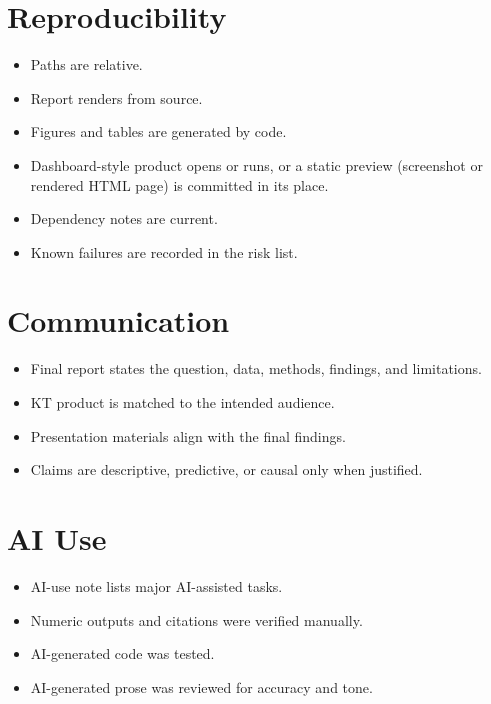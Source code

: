 \documentclass[
  letterpaper,
  DIV=11,
  numbers=noendperiod,
  oneside]{scrreprt}
\providecommand{\tightlist}{%
  \setlength{\itemsep}{0pt}\setlength{\parskip}{0pt}}
\begin{document}
\section{Reproducibility}\label{reproducibility-2}

\begin{itemize}
\tightlist
\item[$\square$]
  Paths are relative.
\item[$\square$]
  Report renders from source.
\item[$\square$]
  Figures and tables are generated by code.
\item[$\square$]
  Dashboard-style product opens or runs, or a static preview (screenshot
  or rendered HTML page) is committed in its place.
\item[$\square$]
  Dependency notes are current.
\item[$\square$]
  Known failures are recorded in the risk list.
\end{itemize}

\section{Communication}\label{communication}

\begin{itemize}
\tightlist
\item[$\square$]
  Final report states the question, data, methods, findings, and
  limitations.
\item[$\square$]
  KT product is matched to the intended audience.
\item[$\square$]
  Presentation materials align with the final findings.
\item[$\square$]
  Claims are descriptive, predictive, or causal only when justified.
\end{itemize}

\section{AI Use}\label{ai-use-1}

\begin{itemize}
\tightlist
\item[$\square$]
  AI-use note lists major AI-assisted tasks.
\item[$\square$]
  Numeric outputs and citations were verified manually.
\item[$\square$]
  AI-generated code was tested.
\item[$\square$]
  AI-generated prose was reviewed for accuracy and tone.
\end{itemize}
\end{document}
